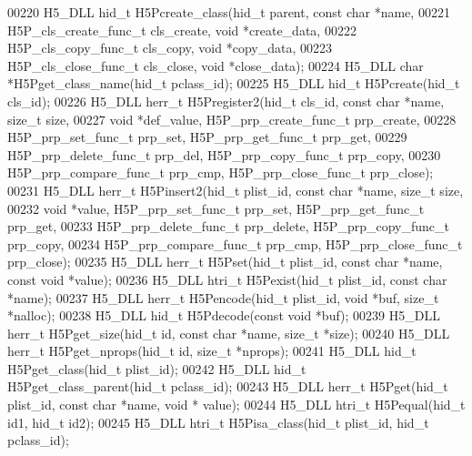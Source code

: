\begin{DoxyCode}
00220 H5\_DLL hid\_t H5Pcreate\_class(hid\_t parent, \textcolor{keyword}{const} \textcolor{keywordtype}{char} *name,
00221     H5P\_cls\_create\_func\_t cls\_create, \textcolor{keywordtype}{void} *create\_data,
00222     H5P\_cls\_copy\_func\_t cls\_copy, \textcolor{keywordtype}{void} *copy\_data,
00223     H5P\_cls\_close\_func\_t cls\_close, \textcolor{keywordtype}{void} *close\_data);
00224 H5\_DLL \textcolor{keywordtype}{char} *H5Pget\_class\_name(hid\_t pclass\_id);
00225 H5\_DLL hid\_t H5Pcreate(hid\_t cls\_id);
00226 H5\_DLL herr\_t H5Pregister2(hid\_t cls\_id, \textcolor{keyword}{const} \textcolor{keywordtype}{char} *name, \textcolor{keywordtype}{size\_t} size,
00227     \textcolor{keywordtype}{void} *def\_value, H5P\_prp\_create\_func\_t prp\_create,
00228     H5P\_prp\_set\_func\_t prp\_set, H5P\_prp\_get\_func\_t prp\_get,
00229     H5P\_prp\_delete\_func\_t prp\_del, H5P\_prp\_copy\_func\_t prp\_copy,
00230     H5P\_prp\_compare\_func\_t prp\_cmp, H5P\_prp\_close\_func\_t prp\_close);
00231 H5\_DLL herr\_t H5Pinsert2(hid\_t plist\_id, \textcolor{keyword}{const} \textcolor{keywordtype}{char} *name, \textcolor{keywordtype}{size\_t} size,
00232     \textcolor{keywordtype}{void} *value, H5P\_prp\_set\_func\_t prp\_set, H5P\_prp\_get\_func\_t prp\_get,
00233     H5P\_prp\_delete\_func\_t prp\_delete, H5P\_prp\_copy\_func\_t prp\_copy,
00234     H5P\_prp\_compare\_func\_t prp\_cmp, H5P\_prp\_close\_func\_t prp\_close);
00235 H5\_DLL herr\_t H5Pset(hid\_t plist\_id, \textcolor{keyword}{const} \textcolor{keywordtype}{char} *name, \textcolor{keyword}{const} \textcolor{keywordtype}{void} *value);
00236 H5\_DLL htri\_t H5Pexist(hid\_t plist\_id, \textcolor{keyword}{const} \textcolor{keywordtype}{char} *name);
00237 H5\_DLL herr\_t H5Pencode(hid\_t plist\_id, \textcolor{keywordtype}{void} *buf, \textcolor{keywordtype}{size\_t} *nalloc);
00238 H5\_DLL hid\_t  H5Pdecode(\textcolor{keyword}{const} \textcolor{keywordtype}{void} *buf);
00239 H5\_DLL herr\_t H5Pget\_size(hid\_t \textcolor{keywordtype}{id}, \textcolor{keyword}{const} \textcolor{keywordtype}{char} *name, \textcolor{keywordtype}{size\_t} *size);
00240 H5\_DLL herr\_t H5Pget\_nprops(hid\_t \textcolor{keywordtype}{id}, \textcolor{keywordtype}{size\_t} *nprops);
00241 H5\_DLL hid\_t H5Pget\_class(hid\_t plist\_id);
00242 H5\_DLL hid\_t H5Pget\_class\_parent(hid\_t pclass\_id);
00243 H5\_DLL herr\_t H5Pget(hid\_t plist\_id, \textcolor{keyword}{const} \textcolor{keywordtype}{char} *name, \textcolor{keywordtype}{void} * value);
00244 H5\_DLL htri\_t H5Pequal(hid\_t id1, hid\_t id2);
00245 H5\_DLL htri\_t H5Pisa\_class(hid\_t plist\_id, hid\_t pclass\_id);

\end{DoxyCode}
